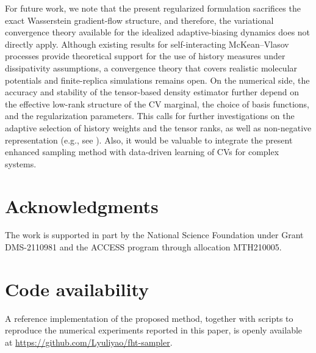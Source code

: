 \documentclass[a4paper,fleqn]{cas-sc}
\theoremstyle{definition}
\begin{document}
For future work, we note that the present regularized formulation sacrifices the exact Wasserstein gradient-flow structure, and therefore, the variational convergence theory available for the idealized adaptive-biasing dynamics does not directly apply. 
Although existing results for self-interacting McKean--Vlasov processes provide theoretical support for the use of history measures under dissipativity assumptions, a convergence theory that covers realistic molecular potentials and finite-replica simulations remains open. 
On the numerical side, the accuracy and stability of the tensor-based density estimator further depend on the effective low-rank structure of the CV marginal, the choice of basis functions, and the regularization parameters. This calls for further investigations on the adaptive selection of history weights and the tensor ranks, as well as non-negative representation (e.g., see \cite{Tang_Dwaraknath_arxiv_2025}). Also, it would be valuable to integrate the present enhanced sampling method with data-driven learning of CVs for complex systems.

\section*{Acknowledgments}
The work is supported in part by the
National Science Foundation under Grant DMS-2110981 and the
ACCESS program through allocation MTH210005.

\section*{Code availability}
A reference implementation of the proposed method, together with scripts to reproduce the numerical experiments reported in this paper, is openly available at \url{https://github.com/Lyuliyao/fht-sampler}.




%
%
\end{document}
